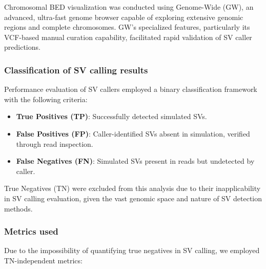 Chromosomal BED visualization was conducted using Genome-Wide (GW), an advanced, 
ultra-fast genome browser capable of exploring extensive genomic regions and 
complete chromosomes. GW's specialized features, particularly its VCF-based 
manual curation capability, facilitated rapid validation of SV caller 
predictions.

\subsubsection{Classification of SV calling results}

Performance evaluation of SV callers employed a binary classification framework 
with the following criteria:

\begin{itemize}[label=\tiny\raise.5ex\hbox{•}, leftmargin=\parindent]

    \item \textbf{True Positives (TP)}: Successfully detected simulated SVs.
    
    \item \textbf{False Positives (FP)}: Caller-identified SVs absent in 
    simulation, verified through read inspection.
    
    \item \textbf{False Negatives (FN)}: Simulated SVs present in reads but 
    undetected by caller.

\end{itemize}

True Negatives (TN) were excluded from this analysis due to their 
inapplicability in SV calling evaluation, given the vast genomic space and 
nature of SV detection methods.

\subsubsection{Metrics used}

Due to the impossibility of quantifying true negatives in SV calling, we 
employed TN-independent metrics:

